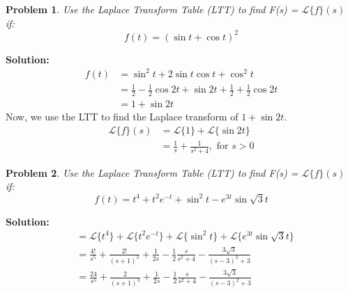 \documentclass{article}
\newtheorem{problem}{Problem}
\begin{document}
    \newpage
    \begin{problem}
        Use the Laplace Transform Table (LTT) to find F(s) = $\mathcal{L}\{f\}(s)$ if:
        \[
            f(t) = (\sin{t} + \cos{t})^{2}
        \]
    \end{problem}
    \textbf{Solution:}
    \begin{align*}
        f(t) &= \sin^{2}{t} +2\sin{t}\cos{t} + \cos^{2}{t} \\
        &= \frac{1}{2} - \frac{1}{2}\cos{2t} + \sin{2t} + \frac{1}{2} + \frac{1}{2}\cos{2t} \\
        &= 1 + \sin{2t} 
    \end{align*}
    Now, we use the LTT to find the Laplace transform of $1 + \sin{2t}$. \\
    \begin{align*}
        \mathcal{L}\{f\}(s) &= \mathcal{L}\{1\} + \mathcal{L}\{\sin{2t}\} \\
        &= \frac{1}{s} + \frac{1}{s^{2} + 4}, \text{ for } s > 0 
    \end{align*}

    \newpage
    \begin{problem}
        Use the Laplace Transform Table (LTT) to find F(s) = $\mathcal{L}\{f\}(s)$ if:
        \[
            f(t) = t^{4} + t^{2}e^{-t} + \sin^{2}{t} - e^{3t}\sin{\sqrt{3}t}
        \]
    \end{problem}
    \textbf{Solution:}
    \begin{align*}
        &= \mathcal{L}\{t^{4}\}  + \mathcal{L}\{t^{2}e^{-t}\} + \mathcal{L}\{\sin^{2}{t}\} + \mathcal{L}\{e^{3t}\sin{\sqrt{3}t}\} \\
        &= \frac{4!}{s^{5}} + \frac{2!}{(s + 1)^{3}} + \frac{1}{2s} - \frac{1}{2}\frac{s}{s^{2} + 4} -\frac{3\sqrt{3}}{(s - 3)^{2} + 3} \\
        &= \frac{24}{s^{5}} + \frac{2}{(s + 1)^{3}} + \frac{1}{2s} - \frac{1}{2}\frac{s}{s^{2} + 4} -\frac{3\sqrt{3}}{(s - 3)^{2} + 3} \\
    \end{align*}
\end{document}
